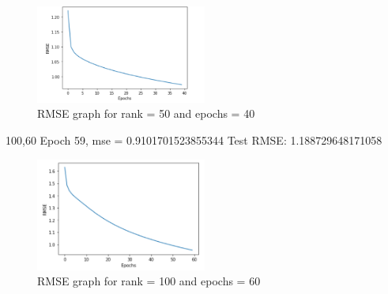 \documentclass[final]{cvpr}
\begin{document}
\begin{figure}[h]
	\includegraphics[width=0.5\textwidth]{./50_40_graph.PNG}
	\caption{RMSE graph for rank = 50 and epochs = 40}
\end{figure}

100,60
Epoch 59, mse = 0.9101701523855344
Test RMSE: 1.188729648171058

\begin{figure}[h]
	\includegraphics[width=0.5\textwidth]{./100_60_graph.PNG}
	\caption{RMSE graph for rank = 100 and epochs = 60}
\end{figure}


\hspace{2em}

\end{document}
